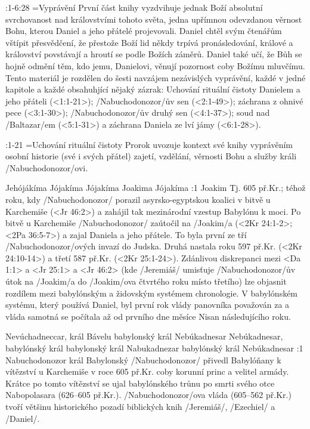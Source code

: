 


:1-6:28 {}={Vyprávění}  První část knihy vyzdvihuje jednak Boží absolutní svrchovanost nad královstvími tohoto světa, jedna upřímnou odevzdanou věrnost Bohu, kterou Daniel a jeho přátelé projevovali. 
Daniel chtěl svým čtenářům vštípit přesvědčení, že přestože Boží lid někdy trpívá pronásledování, králové a království povstávají a hroutí se podle Božích záměrů. Daniel také učí, že Bůh se hojně odmění těm, kdo jemu, Danielovi, věnují pozornost coby Božímu mluvčímu. Tento materiál je rozdělen do šesti navzájem nezávislých vyprávění, každé v jedné kapitole a každé obsahuhjící nějaký zázrak:
Uchování rituální čistoty Danielem a jeho přáteli (<1:1-21>); \x/Nabuchodonozor/ův sen (<2:1-49>); záchrana z ohnivé pece (<3:1-30>); \x/Nabuchodonozor/ův druhý sen (<4:1-37>); soud nad \x/Baltazar/em (<5:1-31>) a záchrana Daniela ze lví jámy (<6:1-28>).

:1-21 {}={Uchování rituální čistoty}  Prorok uvozuje kontext své knihy vyprávěním osobní historie (své i svých přátel) zajetí, vzdělání, věrnosti Bohu a služby králi \x/Nabuchodonozor/ovi.

    {Jehójákíma} %
    {Jójakíma}  %
    {Jójakíma} %
    {Joakima}  %
    {Jójakíma}  %
:1 {Joakim}  Tj. 605 př.Kr.; téhož roku, kdy \x/Nabuchodonozor/ porazil  asyrsko-egyptskou koalici v bitvě u Karchemiše (<Jr 46:2>) a zahájil tak mezinárodní vzestup Babylónu k moci. Po bitvě u Karchemiše \x/Nabuchodonozor/ zaútočil na \x/Joakim/a (<2Kr 24:1-2>; <2Pa 36:5-7>) a zajal Daniela a jeho přátele. 
To byla první ze tří \x/Nabuchodonozor/ových  invazí do Judska. Druhá nastala roku 597 př.Kr. (<2Kr 24:10-14>) a třetí 587 př.Kr. (<2Kr 25:1-24>). Zdánlivou diskrepanci mezi <Da 1:1> a <Jr 25:1> a <Jr 46:2> (kde \x/Jeremiáš/ umisťuje \x/Nabuchodonozor/ův útok na \x/Joakim/a do \x/Joakim/ova čtvrtého roku místo třetího) lze objasnit rozdílem mezi babylónským a židovským systémem chronologie. V babylónském systému, který používá Daniel, byl první rok vlády panovníka považován za  a vláda samotná se počítala až od prvního dne měsíce Nisan následujícího roku.

    {Nevúchadneccar, král Bávelu} %
    {babylonský král Nebúkadnesar}  %
    {Nebúkadnesar, babylónský král} %
    {babylonský král Nabukadnezar}  %
    {babylónský král Nebúkadnesar}  %
:1 {Nabuchodonozor král Babylonský}  \x/Nabuchodonozor/ přivedl Babylóňany k vítězství u Karchemiše v roce 605 př.Kr. coby korunní princ a velitel armády. Krátce po tomto vítězství se ujal babylónského trůnu po smrti svého otce Nabopolasara (626--605 př.Kr.). \x/Nabuchodonozor/ova vláda (605--562 př.Kr.) tvoří většinu historického pozadí  biblických knih \x/Jeremiáš/, \x/Ezechiel/ a \x/Daniel/.     

